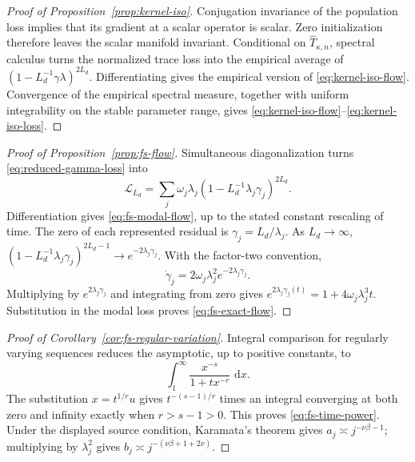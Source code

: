 \documentclass[11pt,a4paper]{article}
\numberwithin{equation}{section}
\theoremstyle{definition}
\theoremstyle{remark}
\newcommand{\loss}{\mathcal L}
\newcommand{\dd}{\,\mathrm d}
\begin{document}
\begin{proof}[Proof of Proposition~\ref{prop:kernel-iso}]
Conjugation invariance of the population loss implies that its gradient at a
scalar operator is scalar.  Zero initialization therefore leaves the scalar
manifold invariant.  Conditional on $\widehat T_{\kappa,n}$, spectral calculus
turns the normalized trace loss into the empirical average of
$(1-L_d^{-1}\gamma\lambda)^{2L_d}$.  Differentiating gives the empirical
version of \eqref{eq:kernel-iso-flow}.  Convergence of the empirical spectral
measure, together with uniform integrability on the stable parameter range,
gives \eqref{eq:kernel-iso-flow}--\eqref{eq:kernel-iso-loss}.
\end{proof}

\begin{proof}[Proof of Proposition~\ref{prop:fs-flow}]
Simultaneous diagonalization turns \eqref{eq:reduced-gamma-loss} into
\[
 \loss_{L_d}=\sum_j\omega_j\lambda_j
 \left(1-L_d^{-1}\lambda_j\gamma_j\right)^{2L_d}.
\]
Differentiation gives \eqref{eq:fs-modal-flow}, up to the stated constant
rescaling of time.  The zero of each represented residual is
$\gamma_j=L_d/\lambda_j$.  As $L_d\to\infty$,
$(1-L_d^{-1}\lambda_j\gamma_j)^{2L_d-1}\to
e^{-2\lambda_j\gamma_j}$.  With the factor-two convention,
\[
 \dot\gamma_j=2\omega_j\lambda_j^2e^{-2\lambda_j\gamma_j}.
\]
Multiplying by $e^{2\lambda_j\gamma_j}$ and integrating from zero gives
$e^{2\lambda_j\gamma_j(t)}=1+4\omega_j\lambda_j^3t$.  Substitution in the
modal loss proves \eqref{eq:fs-exact-flow}.
\end{proof}

\begin{proof}[Proof of Corollary~\ref{cor:fs-regular-variation}]
Integral comparison for regularly varying sequences reduces the asymptotic,
up to positive constants, to
\[
 \int_1^\infty\frac{x^{-s}}{1+t x^{-r}}\,\dd x.
\]
The substitution $x=t^{1/r}u$ gives
$t^{-(s-1)/r}$ times an integral converging at both zero and infinity exactly
when $r>s-1>0$.  This proves \eqref{eq:fs-time-power}.  Under the displayed
source condition, Karamata's theorem gives
$a_j\asymp j^{-\nu\beta-1}$; multiplying by $\lambda_j^2$ gives
$b_j\asymp j^{-(\nu\beta+1+2\nu)}$.
\end{proof}
\end{document}
